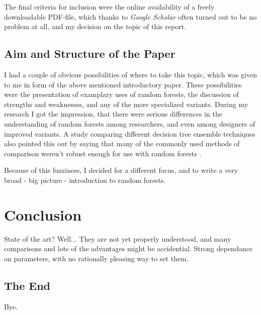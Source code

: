 \documentclass[a4paper,man,12pt,apacite]{apa6} %
\begin{document}
The final criteria for inclusion were the online availability of a freely
downloadable PDF-file, which thanks to \emph{Google Scholar} often turned
out to be no problem at all, and my decision on the topic of
this report.

\subsection{Aim and Structure of the Paper}
I had a couple of obvious possibilities of where to take this topic, which
was given to me in form of the above mentioned introductory paper.
These possibilities were the presentation of examplary uses of random
forests, the discussion of strengths and weaknesses, and any of the more
specialized variants.
During my research I got the impression, that there were serious
differences in the understanding of random forests among researchers,
and even among designers of improved variants.
A study comparing different decision tree ensemble techniques also pointed
this out by saying that many of the commonly used methods of comparison
weren't robust enough for use with random forests \cite{banfield2007comparison}.

Because of this fuzziness, I decided for a different focus, and to write
a very broad - big picture - introduction to random forests.

\section{Conclusion}
State of the art? Well... They are not yet properly understood, and
many comparisons and lots of the advantages might be accidential.
Strong dependance on parameters, with no rationally pleasing way to set them.

\subsection{The End}
Bye.


\end{document}
